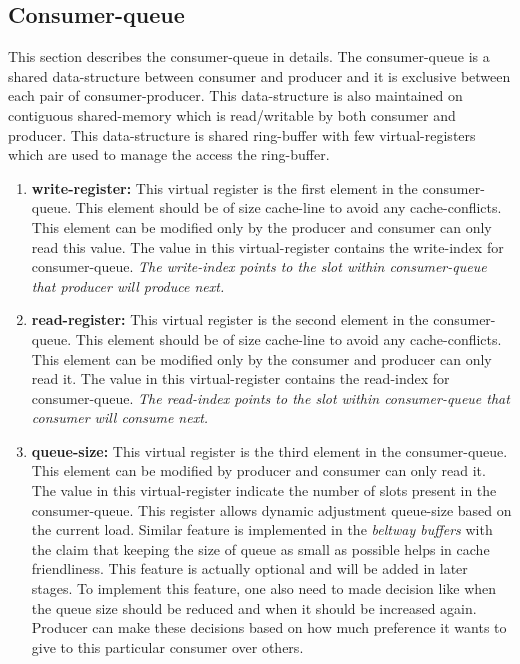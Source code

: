 \documentclass[a4paper,twoside]{report} %
\begin{document}
\subsection{Consumer-queue}
This section describes the consumer-queue in details.
The consumer-queue is a shared data-structure between consumer and
producer and it is exclusive between each pair of consumer-producer.
This data-structure is also maintained on contiguous shared-memory 
which is read/writable by both consumer and producer.  This
data-structure is shared ring-buffer with few virtual-registers 
which are used to manage the access the ring-buffer.

\begin{enumerate} 
  \item \textbf{write-register:} This virtual register is the first
  element in the consumer-queue.  This element should be of size
  cache-line to avoid any cache-conflicts.  This element can be
  modified only by the producer and consumer can only read this value.
  The value in this virtual-register contains the write-index for
  consumer-queue.  \textit{The write-index points to the slot within
  consumer-queue that producer will produce next.}

  \item \textbf{read-register:} This virtual register is the second
  element in the consumer-queue.  This element should be of size
  cache-line to avoid any cache-conflicts.  This element can be
  modified only by the consumer and producer can only read it.
  The value in this virtual-register contains the read-index for
  consumer-queue.  \textit{The read-index points to the slot within
  consumer-queue that consumer will consume next.}

  \item \textbf{queue-size:} This virtual register is the third
  element in the consumer-queue.  This element can be modified by
  producer and consumer can only read it.  The value in this
  virtual-register indicate the number of slots present in the
  consumer-queue.  This register allows dynamic adjustment queue-size
  based on the current load.  Similar feature is implemented in the
  \textit{beltway buffers} with the claim that keeping the size of 
  queue as small as possible helps in cache friendliness.  This
  feature is actually optional and will be added in later stages.
  To implement this feature, one also need to made decision like when
  the queue size should be reduced and when it should be increased
  again.  Producer can make these decisions based on how much
  preference it wants to give to this particular consumer over others.
  \end{enumerate} 
\end{document}
